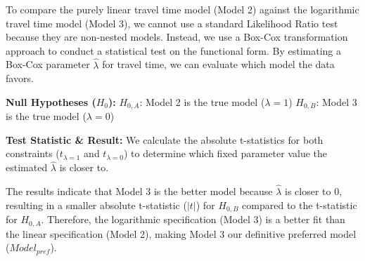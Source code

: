 \documentclass[11pt,a4paper]{article}
\begin{document}
To compare the purely linear travel time model (Model 2) against the logarithmic travel time model (Model 3), we cannot use a standard Likelihood Ratio test because they are non-nested models. Instead, we use a Box-Cox transformation approach to conduct a statistical test on the functional form. By estimating a Box-Cox parameter $\hat{\lambda}$ for travel time, we can evaluate which model the data favors.
\begin{description}
    \item \textbf{Null Hypotheses ($H_0$):} 
    $H_{0,A}$: Model 2 is the true model ($\lambda = 1$)
    $H_{0,B}$: Model 3 is the true model ($\lambda = 0$)
    \item \textbf{Test Statistic \& Result:} We calculate the absolute t-statistics for both constraints ($t_{\lambda=1}$ and $t_{\lambda=0}$) to determine which fixed parameter value the estimated $\hat{\lambda}$ is closer to. 
    
    The results indicate that Model 3 is the better model because $\hat{\lambda}$ is closer to 0, resulting in a smaller absolute t-statistic ($|t|$) for $H_{0,B}$ compared to the t-statistic for $H_{0,A}$. Therefore, the logarithmic specification (Model 3) is a better fit than the linear specification (Model 2), making Model 3 our definitive preferred model ($Model_{pref}$).
\end{description}
\end{document}
